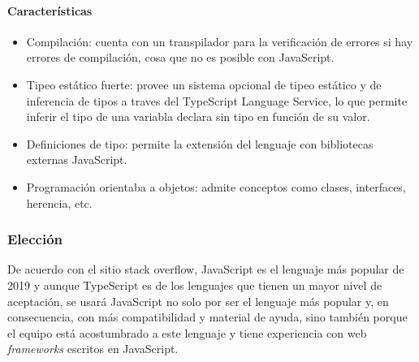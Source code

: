 \paragraph*{Características}
\begin{itemize}
    \item Compilación: cuenta con un transpilador para la verificación de errores si hay errores de compilación, cosa que no es posible con JavaScript.
    \item Tipeo estático fuerte: provee un sistema opcional de tipeo estático y de inferencia de tipos a traves del TypeScript Language Service, lo que permite inferir el tipo de una variabla declara sin tipo en función de su valor.
    \item Definiciones de tipo: permite la extensión del lenguaje con bibliotecas externas JavaScript.
    \item Programación orientaba a objetos: admite conceptos como clases, interfaces, herencia, etc.
\end{itemize}



\subsubsection*{Elección}

De acuerdo con el sitio stack overflow\cite{noauthor_stack_nodate}, JavaScript es el lenguaje más popular de 2019 y aunque TypeScript es de los lenguajes que tienen un mayor nivel de aceptación, se usará JavaScript no solo por ser el lenguaje más popular y, en consecuencia, con más compatibilidad y material de ayuda, sino también porque el equipo está acostumbrado a este lenguaje y tiene experiencia con web \textit{frameworks} escritos en JavaScript.

